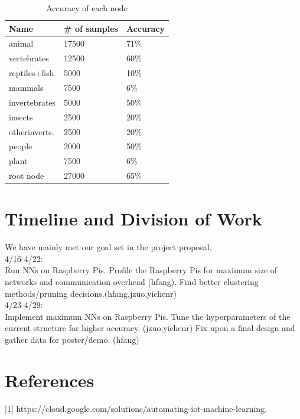\documentclass{article}
\begin{document}
\begin{table}[t]
  \caption{Accuracy of each node}
  \label{sample-table}
  \centering
  \begin{tabular}{lll}
    \toprule
    \cmidrule{1-2}
    Name     & \# of samples & Accuracy \\
    \midrule
    animal & 17500 & 71\% \\
    vertebrates & 12500 & 60\% \\
    reptiles+fish & 5000 & 10\% \\
    mammals & 7500 & 6\% \\
    invertebrates & 5000 & 50\% \\
    insects & 2500 & 20\% \\
    otherinverts. & 2500 & 20\% \\
    people & 2000 & 50\% \\ 
    plant & 7500 & 6\% \\ 
    root node & 27000 & 65\% \\
    \bottomrule
  \end{tabular}
\end{table}

\section{Timeline and Division of Work }
We have mainly met our goal set in the project proposal.\\
4/16-4/22:\\
Run NNs on Raspberry Pis. Profile the Raspberry Pis for maximum size of networks and communication overhead (hfang). Find better clustering methods/pruning decisions.(hfang,jzuo,yichenr)\\
4/23-4/29:\\
Implement maximum NNs on Raspberry Pis. Tune the hyperparameters of the current structure for higher accuracy. (jzuo,yichenr) Fix upon a final design and gather data for poster/demo. (hfang)



\newpage
\section*{References}

\medskip

\small

[1] https://cloud.google.com/solutions/automating-iot-machine-learning.
\end{document}
